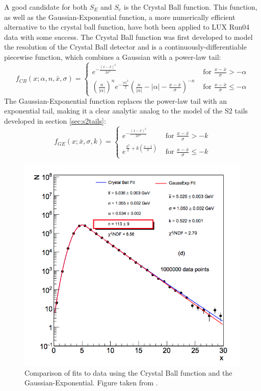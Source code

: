 A good candidate for both $S_E$ and $S_e$ is the Crystal Ball function\cite{crystalball}. This function, as well as the Gaussian-Exponential function, a more numerically efficient alternative to the crystal ball function\cite{alternatecrystalball}, have both been applied to LUX Run04 data with some success. The Crystal Ball function was first developed to model the resolution of the Crystal Ball detector and is a continuously-differentiable piecewise function, which combines a Gaussian with a power-law tail:
\begin{equation}\label{eq:crystalball}
f_{CB}(x;\alpha,n,\bar{x},\sigma) = 
\begin{cases}
 e^{-\frac{(x-\bar{x})^2}{2\sigma^2}} & \mbox{ for } \frac{x-\bar{x}}{\sigma}>-\alpha  \\ 
\left(\frac{n}{|\alpha|}\right)^n e^{-\frac{|\alpha|^2}{2}}\left(\frac{n}{|\alpha|}-|\alpha|-\frac{x-\bar{x}}{\sigma} \right)^{-n} & \mbox{ for } \frac{x-\bar{x}}{\sigma} \leq -\alpha 
 \end{cases}
 \end{equation}
The Gaussian-Exponential function replaces the power-law tail with an exponential tail, making it a clear analytic analog to the model of the S2 tails developed in section \ref{sec:s2tails}:
\begin{equation}\label{eq:gausexp}
f_{GE}(x;\bar{x},\sigma,k) = 
\begin{cases}
 e^{-\frac{(x-\bar{x})^2}{2\sigma^2}} & \mbox{ for } \frac{x-\bar{x}}{\sigma}>-k  \\ 
 e^{\frac{k^2}{2}+k(\frac{x-\bar{x}}{\sigma})}& \mbox{ for } \frac{x-\bar{x}}{\sigma} \leq -k
 \end{cases}
 \end{equation}
\begin{figure}[h!]
\centering
\includegraphics[width=\textwidth]{Figures/crystalball.png}
\caption{Comparison of fits to data using the Crystal Ball function and the Gaussian-Exponential. Figure taken from \cite{alternatecrystalball}.}
\label{fig:crystalball}
\end{figure}

